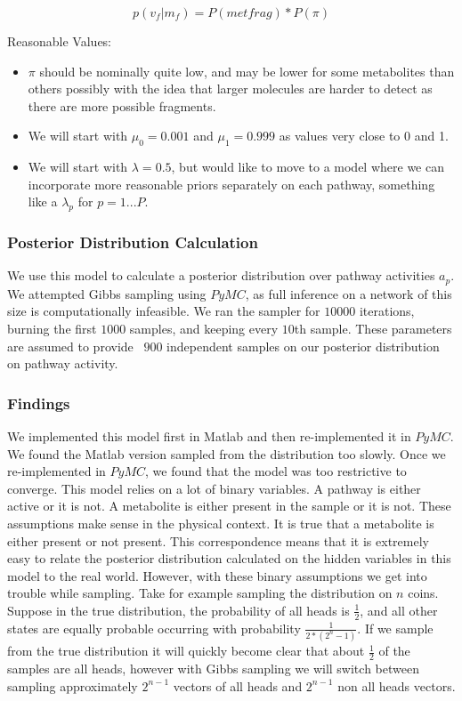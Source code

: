 \documentclass[11pt]{article}
\begin{document}
$$p(v_f | m_f) = P(metfrag)  * P(\pi)$$

Reasonable Values:
\begin{itemize}
\item $\pi$ should be nominally quite low, and may be lower for some metabolites than others possibly with the idea that larger molecules are harder to detect as there are more possible fragments.
\item We will start with $\mu_0 = 0.001$ and $\mu_1 = 0.999$ as values very close to 0 and 1. 
\item We will start with $\lambda = 0.5$, but would like to move to a model where we can incorporate more reasonable priors separately on each pathway, something like a $\lambda_p$ for $p = 1...P$. 

\end{itemize}



\subsubsection{Posterior Distribution Calculation}

We use this model to calculate a posterior distribution over pathway activities $a_p$. We attempted Gibbs sampling using $PyMC$, as full inference on a network of this size is computationally infeasible. We ran the sampler for $10000$ iterations, burning the first $1000$ samples, and keeping every $10$th sample. These parameters are assumed to provide ~$900$ independent samples on our posterior distribution on pathway activity. 

\subsubsection{Findings}

We implemented this model first in Matlab and then re-implemented it in $PyMC$. We found the Matlab version sampled from the distribution too slowly. Once we re-implemented in $PyMC$, we found that the model was too restrictive to converge. This model relies on a lot of binary variables. A pathway is either active or it is not. A metabolite is either present in the sample or it is not. These assumptions make sense in the physical context. It is true that a metabolite is either present or not present. This correspondence means that it is extremely easy to relate the posterior distribution calculated on the hidden variables in this model to the real world. However, with these binary assumptions we get into trouble while sampling. Take for example sampling the distribution on $n$ coins. Suppose in the true distribution, the probability of all heads is $\frac{1}{2}$, and all other states are equally probable occurring with probability $\frac{1}{2 * (2 ^ n - 1)}$. If we sample from the true distribution it will quickly become clear that about $\frac{1}{2}$ of the samples are all heads, however with Gibbs sampling we will switch between sampling approximately $2 ^ {n - 1}$ vectors of all heads and $2 ^ {n-1}$ non all heads vectors. 
\end{document}

